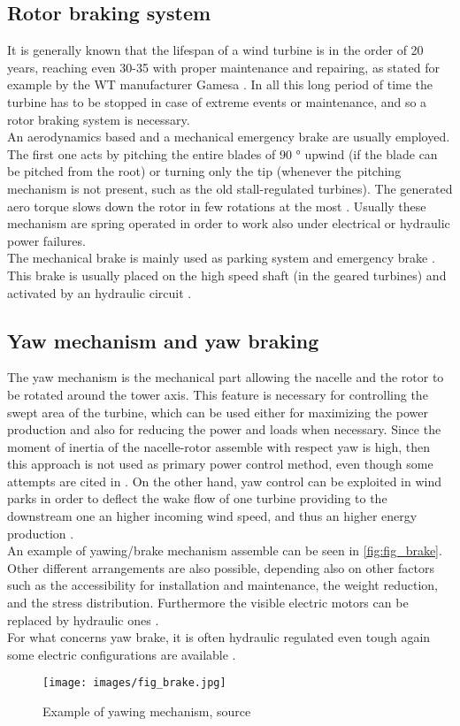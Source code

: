 \subsection{Rotor braking system}
It is generally known that the lifespan of a wind turbine is in the order of 20 years, reaching even 30-35 with proper maintenance and repairing, as stated for example by the WT manufacturer Gamesa \cite{gamesa_life_turbine}. In all this long period of time the turbine has to be stopped in case of extreme events or maintenance, and so a rotor braking system is necessary.\\
An aerodynamics based and a mechanical emergency brake are usually employed. The first one acts by pitching the entire blades of 90 $\si{\degree}$ upwind (if the blade can be pitched from the root) or turning only the tip (whenever the pitching mechanism is not present, such as the old stall-regulated turbines). The generated aero torque slows down the rotor in few rotations at the most \cite{brake_dromstorre}. Usually these mechanism are spring operated in order to work also under electrical or hydraulic power failures.\\
The mechanical brake is mainly used as parking system and emergency brake \cite{brake_dromstorre}. This brake is usually placed on the high speed shaft (in the geared turbines) and activated by an hydraulic circuit \cite{brake_wiley}. 

\subsection{Yaw mechanism and yaw braking}
The yaw mechanism is the mechanical part allowing the nacelle and the rotor to be rotated around the tower axis. This feature is necessary for controlling the swept area of the turbine, which can be used either for maximizing the power production and also for reducing the power and loads when necessary. Since the moment of inertia of the nacelle-rotor assemble with respect yaw is high, then this approach is not used as primary power control method, even though some attempts are cited in \cite{Kim_2014}. On the other hand, yaw control can be exploited in wind parks in order to deflect the wake flow of one turbine providing to the downstream one an higher incoming wind speed, and thus an higher energy production \cite{Kim_2014}.\\
An example of yawing/brake mechanism assemble can be seen in \autoref{fig:fig_brake}. Other different arrangements are also possible, depending also on other factors such as the accessibility for installation and maintenance, the weight reduction, and the stress distribution. Furthermore the visible electric motors can be replaced by hydraulic ones \cite{Kim_2014}.\\
For what concerns yaw brake, it is often hydraulic regulated even tough again some electric configurations are available \cite{Kim_2014}. 
\begin{figure}
  \centering
  \texttt{[image: images/fig\_brake.jpg]}
  \caption{Example of yawing mechanism, source \cite{Kim_2014}}
  \label{fig:fig_brake}
\end{figure}
